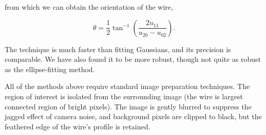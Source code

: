 \noindent from which we can obtain the orientation of the wire,

\begin{equation}
\theta = \frac{1}{2}\tan^{-1}\left(\frac{2u_{11}}{u_{20} - u_{02}}\right).
\end{equation}

\noindent The technique is much faster than fitting Gaussians, and its precision is comparable. We have also found it to be more robust, though not quite as robust as the ellipse-fitting method.

All of the methods above require standard image preparation techniques. The region of interest is isolated from the surrounding image (the wire is largest connected region of bright pixels). The image is gently blurred to suppress the jagged effect of camera noise, and background pixels are clipped to black, but the feathered edge of the wire's profile is retained.